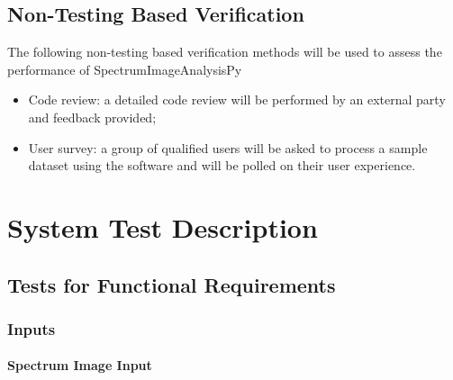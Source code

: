 \documentclass[12pt, titlepage]{article}
\newcommand{\progname}{SpectrumImageAnalysisPy}
\begin{document}
		

\subsection{Non-Testing Based Verification}

The following non-testing based verification methods will be used to assess the performance of \progname{}

\begin{itemize}
	\item Code review: a detailed code review will be performed by an external party and feedback provided;
	\item User survey: a group of qualified users will be asked to process a sample dataset using the software and will be polled on their user experience.
\end{itemize}


\section{System Test Description}
	
\subsection{Tests for Functional Requirements}

\subsubsection{Inputs}
		
\paragraph{Spectrum Image Input}
\end{document}
